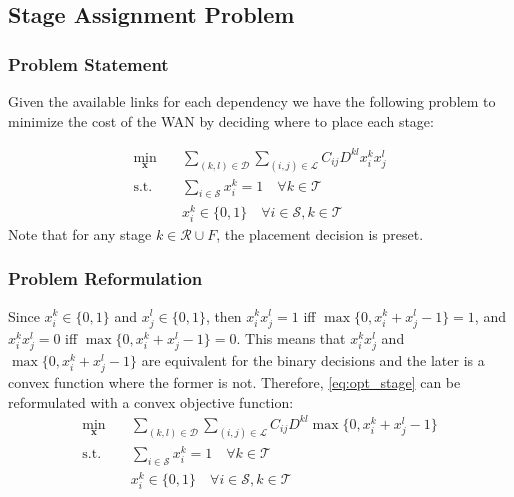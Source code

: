 \subsection{Stage Assignment Problem}

\subsubsection{Problem Statement}

Given the available links for each dependency we have the following problem to minimize the cost of the WAN by deciding where to place each stage:

\begin{subequations}\label{eq:opt_stage}
	\begin{align}
		\min_{\mathbf{x}} \quad & \sum_{(k,l)\in\mathcal{D}}\sum_{(i,j)\in\mathcal{L}}C_{ij}D^{kl}x_i^kx_j^l \nonumber \\
		\text{s.t.}\quad & \sum_{i\in\mathcal{S}}x_i^k = 1 \quad \forall k\in\mathcal{T} \label{eq:opt_stage-sum1} \\
		& x_i^k \in \{0,1\} \quad \forall i\in\mathcal{S},k\in\mathcal{T} \label{eq:opt_stage-binary}
	\end{align}
\end{subequations}
Note that for any stage $k\in\mathcal{R}\cup F$, the placement decision is preset.

\subsubsection{Problem Reformulation}
Since $x_i^k \in \{0,1\}$ and $x_j^l \in \{0,1\}$, then $x_i^kx_j^l=1$ iff $\max\{0,x_i^k+x_j^l-1\}=1$, and $x_i^kx_j^l=0$ iff $\max\{0,x_i^k+x_j^l-1\}=0$.
This means that $x_i^kx_j^l$ and $\max\{0,x_i^k+x_j^l-1\}$ are equivalent for the binary decisions and the later is a convex function where the former is not.
Therefore, \eqref{eq:opt_stage} can be reformulated with a convex objective function: 
\begin{subequations}\label{eq:opt_stage_conv1}
	\begin{align}
		\min_{\mathbf{x}} \quad & \sum_{(k,l)\in\mathcal{D}}\sum_{(i,j)\in\mathcal{L}}C_{ij}D^{kl}\max\{0,x_i^k+x_j^l-1\} \nonumber \\
		\text{s.t.}\quad & \sum_{i\in\mathcal{S}}x_i^k = 1 \quad \forall k\in\mathcal{T} \label{eq:opt_stage_conv1-sum1} \\
		& x_i^k \in \{0,1\} \quad \forall i\in\mathcal{S},k\in\mathcal{T} \label{eq:opt_stage_conv1-binary}
	\end{align}
\end{subequations}

